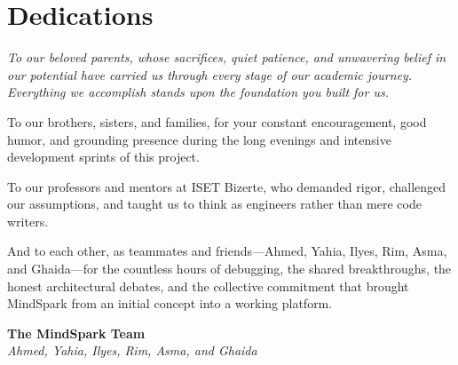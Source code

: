\chapter*{Dedications}

\vspace*{1.0cm}

\begingroup
\itshape
To our beloved parents, whose sacrifices, quiet patience, and unwavering belief in our potential have carried us through every stage of our academic journey. Everything we accomplish stands upon the foundation you built for us.

\vspace{0.8cm}

To our brothers, sisters, and families, for your constant encouragement, good humor, and grounding presence during the long evenings and intensive development sprints of this project.

\vspace{0.8cm}

To our professors and mentors at ISET Bizerte, who demanded rigor, challenged our assumptions, and taught us to think as engineers rather than mere code writers.

\vspace{0.8cm}

And to each other, as teammates and friends---Ahmed, Yahia, Ilyes, Rim, Asma, and Ghaida---for the countless hours of debugging, the shared breakthroughs, the honest architectural debates, and the collective commitment that brought MindSpark from an initial concept into a working platform.
\endgroup

\vspace{1.5cm}

\begin{flushright}
  \textbf{The MindSpark Team}\\
  \textit{Ahmed, Yahia, Ilyes, Rim, Asma, and Ghaida}
\end{flushright}
